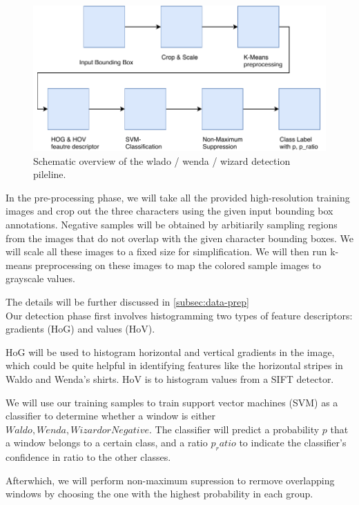 \documentclass[11pt]{article}
\begin{document}
\begin{figure}
    \centering
    \includegraphics[width=0.9\linewidth]{figures/model_overview} 
    \caption{Schematic overview of the wlado / wenda / wizard detection pileline.}
    \label{fig:model-overview}
\end{figure}

In the pre-processing phase, we will take all the provided high-resolution training images and crop out the three characters using the given input bounding box annotations. Negative samples will be obtained by arbitiarily sampling regions from the images that do not overlap with the given character bounding boxes. We will scale all these images to a fixed size for simplification. We will then run k-means preprocessing on these images to map the colored sample images to grayscale values.

The details will be further discussed in \autoref{subsec:data-prep}\\

Our detection phase first involves histogramming two types of feature descriptors: gradients (HoG) and values (HoV).

HoG will be used to histogram horizontal and vertical gradients in the image, which could be quite helpful in identifying features like the horizontal stripes in Waldo and Wenda's shirts. HoV is to histogram values from a SIFT detector.

We will use our training samples to train support vector machines (SVM) as a classifier to determine whether a window is either \(Waldo, Wenda, Wizard or Negative\). The classifier will predict a probability \(p\) that a window belongs to a certain class, and a ratio \(p_ratio\) to indicate the classifier's confidence in ratio to the other classes.

Afterwhich, we will perform non-maximum supression to rermove overlapping windows by choosing the one with the highest probability in each group.
\end{document}
